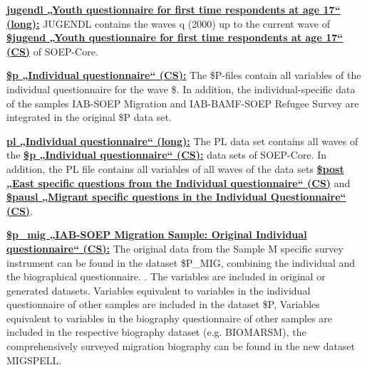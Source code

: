 \documentclass[letterpaper,10pt,openany,onesideH,english]{sphinxmanual}
\begin{document}
 \href{https://paneldata.org/soep-long/data/jugendl}{\textbf{jugendl „Youth questionnaire for first time respondents at age 17“ (long):}} JUGENDL contains the waves q (2000) up to the current wave of  \href{https://paneldata.org/soep-core/data/bgjugend}{\textbf{\$jugend „Youth questionnaire for first time respondents at age 17“ (CS)}} of SOEP-Core.

 \href{https://paneldata.org/soep-core/data/bgp}{\textbf{\$p „Individual questionnaire“ (CS):}} The \$P-files contain all variables of the individual questionnaire for the wave \$. In addition, the individual-specific data of the samples IAB-SOEP Migration and IAB-BAMF-SOEP Refugee Survey are integrated in the original \$P data set.

 \href{https://paneldata.org/soep-long/data/pl}{\textbf{pl „Individual questionnaire“ (long):}} The PL data set contains all waves of the  \href{https://paneldata.org/soep-core/data/bgp}{\textbf{\$p „Individual questionnaire“ (CS):}} data sets of SOEP-Core. In addition, the PL file contains all variables of all waves of the data sets  \href{https://paneldata.org/soep-core/data/hpost}{\textbf{\$post „East specific questions from the Individual questionnaire“ (CS)}} and  \href{https://paneldata.org/soep-core/data/lpausl}{\textbf{\$pausl „Migrant specific questions in the Individual Questionnaire“ (CS)}}.

 \href{https://paneldata.org/soep-core/data/bgp_mig}{\textbf{\$p\_mig „IAB-SOEP Migration Sample: Original Individual questionnaire“ (CS):}} The original data from the Sample M specific survey instrument can be found in the dataset \$P\_MIG, combining the individual and the biographical questionnaire. . The variables are included in original or generated datasets. Variables equivalent to variables in the individual questionnaire of other samples are included in the dataset \$P, Variables equivalent to variables in the biography questionnaire of other samples are included in the respective biography dataset (e.g. BIOMARSM), the comprehensively surveyed migration biography can be found in the new dataset MIGSPELL.
\end{document}
